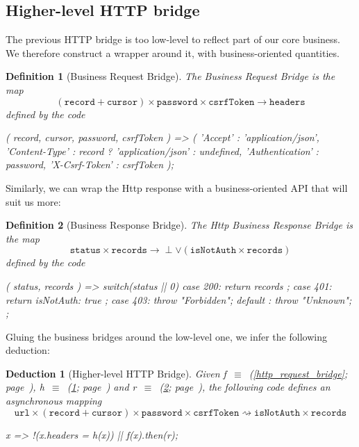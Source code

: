\documentclass[12pt,a4paper]{report}
\newtheorem{definition}{Definition}
\newtheorem{deduction}{Deduction}
\newcommand{\word}[1]{\texttt{#1}}
\newcommand{\symboldef}[2]{#1\ $\equiv$\ (\ref{#2}; page~\pageref{#2})}
\begin{document}
\subsection{Higher-level HTTP bridge}

The previous HTTP bridge is too low-level to reflect part of
our core business. We therefore construct a wrapper around it,
with business-oriented quantities.

\begin{definition}[Business Request Bridge]\label{http_business_request_bridge}
The Business Request Bridge is the map
	\[ (\word{record} + \word{cursor})\times \word{password}\times\word{csrfToken}
		\to \word{headers} \]
defined by the code
\begin{code}
({ record, cursor, password, csrfToken }) => ({
  'Accept'         : 'application/json',
  'Content-Type'   : record ? 'application/json' : undefined,
  'Authentication' : password,
  'X-Csrf-Token'   : csrfToken
 });
\end{code}
\end{definition}

Similarly, we can wrap the Http response with a business-oriented
API that will suit us more:

\begin{definition}[Business Response Bridge]\label{http_business_response_bridge}
The Http Business Response Bridge is the map
	\[ \word{status}\times\word{records}
		\to \perp\vee (\word{isNotAuth}\times \word{records})
	\]
defined by the code
\begin{code}
({ status, records }) => {
  switch(status || 0) {
    case 200: return { records };
    case 401: return { isNotAuth: true };
    case 403: throw "Forbidden";
    default : throw "Unknown";
  }
};
\end{code}
\end{definition}

Gluing the business bridges around the low-level one,
we infer the following deduction:

\begin{deduction}[Higher-level HTTP Bridge]\label{http_business_bridge}
Given \symboldef{f}{http_request_bridge}, \symboldef{h}{http_business_request_bridge}
and \symboldef{r}{http_business_response_bridge},
the following code defines an asynchronous mapping
	\[ \word{url}\times(\word{record} + \word{cursor})\times
		\word{password}\times\word{csrfToken}
	\rightsquigarrow \word{isNotAuth}\times \word{records}
	\]
\begin{code}
x => !(x.headers = h(x)) || f(x).then(r);
\end{code}
\end{deduction}
\end{document}
